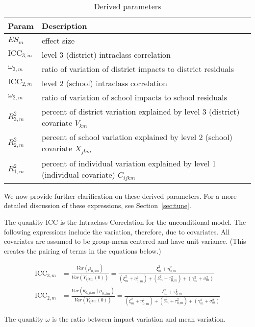 \documentclass[12pt]{article}
\begin{document}
\begin{table}[h]
\begin{tabular}{l | l}
Param				& Description																				\\ \hline
$ES_{m}$			& effect size																				\\
$\text{ICC}_{3,m}$	& level 3 (district) intraclass correlation													\\
$\omega_{3,m}$		& ratio of variation of district impacts to district residuals								\\
$\text{ICC}_{2,m}$	& level 2 (school) intraclass correlation													\\
$\omega_{2,m}$		& ratio of variation of school impacts to school residuals									\\
$R_{3,m}^2$			& percent of district variation explained by level 3 (district) covariate	$V_{km}$			\\
$R_{2,m}^2$			& percent of school variation explained by level 2 (school) covariate	$X_{jkm}$			\\
$R_{1,m}^2$			& percent of individual variation explained by level 1 (individual covariate) $C_{ijkm}$		\\
\end{tabular}
\caption{Derived parameters\label{tab:derived_param}}
\end{table}


We now provide further clarification on these derived parameters.
For a more detailed discussion of these expressions, see Section~\ref{sec:tune}.


The quantity $\text{ICC}$ is the Intraclass Correlation for the unconditional model. The following expressions include the variation, therefore, due to covariates.  All covariates are assumed to be group-mean centered and have unit variance.  (This creates the pairing of terms in the equations below.)

\begin{align*}
\text{ICC}_{3,m} &= \frac{Var(\mu_{0,km})}{ Var(Y_{ijkm}(0))} = \frac{\xi^2_m + \eta_{0,m}^2}{\left(\xi_m^2 +  \eta^2_{0,m}\right) + \left(\delta_m^2  + \tau^2_{0,m}\right) + \left(\gamma_m^2 + \sigma^2_m\right)}\\
\text{ICC}_{2,m} &= \frac{Var(\theta_{0,jkm} \mid \mu_{0,km})}{ Var(Y_{ijkm}(0))} = \frac{\delta_m^2  + \tau_{0,m}^2}{ \left(\xi_m^2 +  \eta^2_{0,m}\right) + \left(\delta_m^2  + \tau^2_{0,m}\right) + \left(\gamma_m^2 + \sigma^2_m\right)}
\end{align*}

The quantity $\omega$ is the ratio between impact variation and mean variation.
\end{document}

